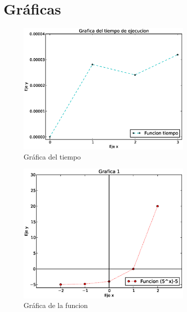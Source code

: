 \documentclass{beamer}
\begin{document}
\section{Gráficas}
\begin{frame}
\begin{figure}[!th]
\begin{center}
\includegraphics[width=0.75\textwidth]{graftime.eps}
\caption{Gráfica del tiempo}
\label{fig:1}
\end{center}
\end{figure}
\end{frame}

\begin{frame}
\begin{figure}[!th]
\begin{center}
\includegraphics[width=0.75\textwidth]{grafcap2.eps}
\caption{Gráfica de la funcion}
\label{fig:1}
\end{center}
\end{figure}
\end{frame}
\end{document}
